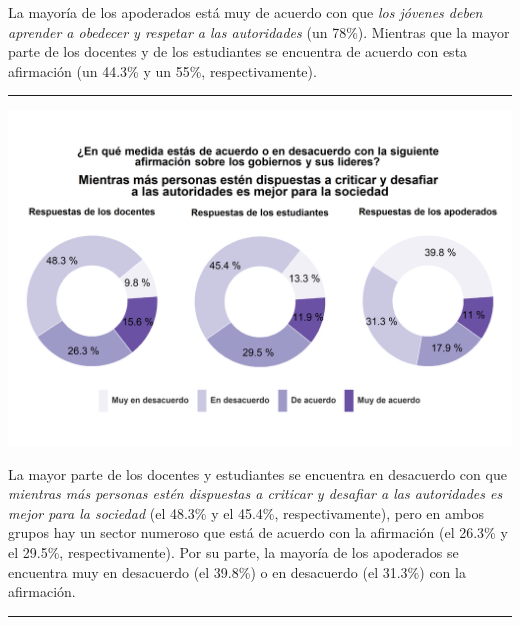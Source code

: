 \documentclass[
  14pt,
]{book}
\let\origfigure\figure
\let\endorigfigure\endfigure
\renewenvironment{figure}[1][2] {
  \expandafter\origfigure\expandafter[H]
} {
  \endorigfigure
}
\begin{document}
La mayoría de los apoderados está muy de acuerdo con que \emph{los jóvenes deben aprender a obedecer y respetar a las autoridades} (un 78\%). Mientras que la mayor parte de los docentes y de los estudiantes se encuentra de acuerdo con esta afirmación (un 44.3\% y un 55\%, respectivamente).

\begin{center}\rule{0.5\linewidth}{0.5pt}\end{center}

\begin{figure}[!ht]

{\centering \includegraphics[width=0.8\linewidth,]{images/graph_aut2} 

}

\caption{Criticar y desafiar a las autoridades es mejor para la sociedad}\label{fig:unnamed-chunk-43}
\end{figure}

La mayor parte de los docentes y estudiantes se encuentra en desacuerdo con que \emph{mientras más personas estén dispuestas a criticar y desafiar a las autoridades es mejor para la sociedad} (el 48.3\% y el 45.4\%, respectivamente), pero en ambos grupos hay un sector numeroso que está de acuerdo con la afirmación (el 26.3\% y el 29.5\%, respectivamente). Por su parte, la mayoría de los apoderados se encuentra muy en desacuerdo (el 39.8\%) o en desacuerdo (el 31.3\%) con la afirmación.

\begin{center}\rule{0.5\linewidth}{0.5pt}\end{center}
\end{document}
